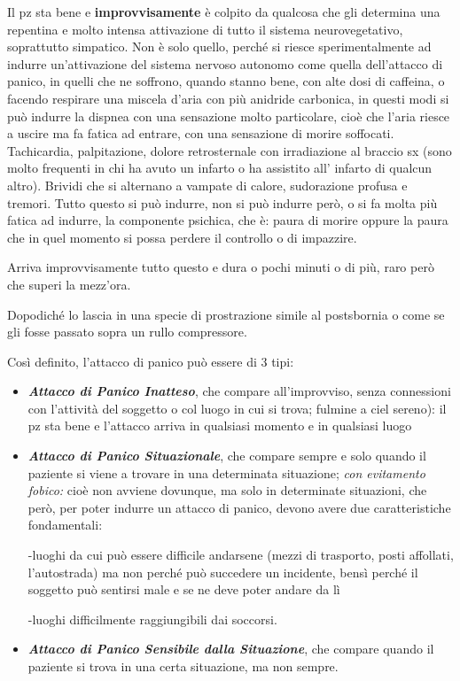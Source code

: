 Il pz sta bene e \textbf{improvvisamente} è colpito da qualcosa che gli
determina una repentina e molto intensa attivazione di tutto il sistema
neurovegetativo, soprattutto simpatico. Non è solo quello, perché si
riesce sperimentalmente ad indurre un'attivazione del sistema nervoso
autonomo come quella dell'attacco di panico, in quelli che ne soffrono,
quando stanno bene, con alte dosi di caffeina, o facendo respirare una
miscela d'aria con più anidride carbonica, in questi modi si può indurre
la dispnea con una sensazione molto particolare, cioè che l'aria riesce
a uscire ma fa fatica ad entrare, con una sensazione di morire
soffocati. Tachicardia, palpitazione, dolore retrosternale con
irradiazione al braccio sx (sono molto frequenti in chi ha avuto un
infarto o ha assistito all' infarto di qualcun altro). Brividi che si
alternano a vampate di calore, sudorazione profusa e tremori. Tutto
questo si può indurre, non si può indurre però, o si fa molta più fatica
ad indurre, la componente psichica, che è: paura di morire oppure la
paura che in quel momento si possa perdere il controllo o di impazzire.

Arriva improvvisamente tutto questo e dura o pochi minuti o di più, raro
però che superi la mezz'ora.

Dopodiché lo lascia in una specie di prostrazione simile al postsbornia
o come se gli fosse passato sopra un rullo compressore.

Così definito, l'attacco di panico può essere di 3 tipi:

\begin{itemize}
\item
  \textbf{\emph{Attacco di Panico Inatteso}}, che compare
  all'improvviso, senza connessioni con l'attività del soggetto o col
  luogo in cui si trova; fulmine a ciel sereno): il pz sta bene e
  l'attacco arriva in qualsiasi momento e in qualsiasi luogo
\item
  \textbf{\emph{Attacco di Panico Situazionale}}, che compare sempre e
  solo quando il paziente si viene a trovare in una determinata
  situazione; \emph{con evitamento fobico:} cioè non avviene dovunque,
  ma solo in determinate situazioni, che però, per poter indurre un
  attacco di panico, devono avere due caratteristiche fondamentali:

  -luoghi da cui può essere difficile andarsene (mezzi di trasporto,
  posti affollati, l'autostrada) ma non perché può succedere un
  incidente, bensì perché il soggetto può sentirsi male e se ne deve
  poter andare da lì

  -luoghi difficilmente raggiungibili dai soccorsi.
\item
  \textbf{\emph{Attacco di Panico Sensibile dalla Situazione}}, che
  compare quando il paziente si trova in una certa situazione, ma non
  sempre.
\end{itemize}

